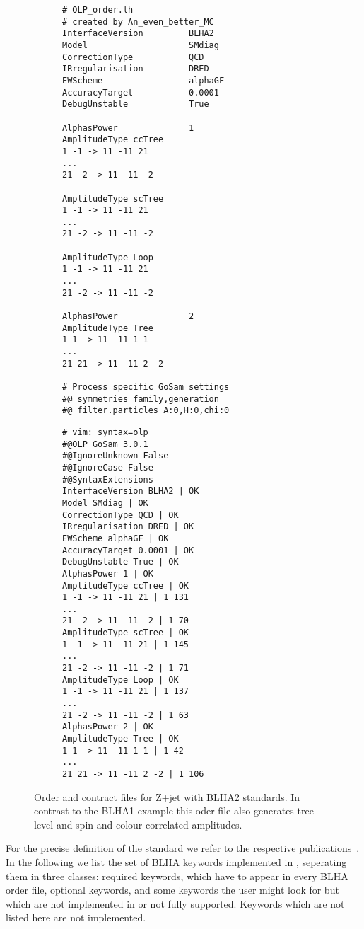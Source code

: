 \begin{figure}
\centering
\begin{subfigure}[]{0.49\textwidth}
\centering
\begin{lstlisting}[title={BLHA2 order file},gobble=0,style=insmall,keepspaces=true,frame=single]
# OLP_order.lh
# created by An_even_better_MC
InterfaceVersion         BLHA2
Model                    SMdiag
CorrectionType           QCD
IRregularisation         DRED
EWScheme                 alphaGF
AccuracyTarget           0.0001
DebugUnstable            True

AlphasPower              1
AmplitudeType ccTree
1 -1 -> 11 -11 21
...
21 -2 -> 11 -11 -2

AmplitudeType scTree
1 -1 -> 11 -11 21
...
21 -2 -> 11 -11 -2

AmplitudeType Loop
1 -1 -> 11 -11 21
...
21 -2 -> 11 -11 -2

AlphasPower              2
AmplitudeType Tree
1 1 -> 11 -11 1 1
...
21 21 -> 11 -11 2 -2

# Process specific GoSam settings
#@ symmetries family,generation
#@ filter.particles A:0,H:0,chi:0
\end{lstlisting}
\end{subfigure}
\hspace*{5pt}
\begin{subfigure}[]{0.46\textwidth}
\centering
\begin{lstlisting}[title={BLHA2 contract file},gobble=0,style=insmall,keepspaces=true,frame=single]
# vim: syntax=olp
#@OLP GoSam 3.0.1
#@IgnoreUnknown False
#@IgnoreCase False
#@SyntaxExtensions
InterfaceVersion BLHA2 | OK
Model SMdiag | OK
CorrectionType QCD | OK
IRregularisation DRED | OK
EWScheme alphaGF | OK
AccuracyTarget 0.0001 | OK
DebugUnstable True | OK
AlphasPower 1 | OK
AmplitudeType ccTree | OK
1 -1 -> 11 -11 21 | 1 131
...
21 -2 -> 11 -11 -2 | 1 70
AmplitudeType scTree | OK
1 -1 -> 11 -11 21 | 1 145
...
21 -2 -> 11 -11 -2 | 1 71
AmplitudeType Loop | OK
1 -1 -> 11 -11 21 | 1 137
...
21 -2 -> 11 -11 -2 | 1 63
AlphasPower 2 | OK
AmplitudeType Tree | OK
1 1 -> 11 -11 1 1 | 1 42
...
21 21 -> 11 -11 2 -2 | 1 106
\end{lstlisting}
\end{subfigure}
\caption{Order and contract files for Z+jet with BLHA2 standards. In contrast to the BLHA1 example this oder file also generates tree-level and spin and colour correlated amplitudes.}
\label{fig:BLHA2}
\end{figure}  

For the precise definition of the standard we refer to the respective publications~\cite{Binoth:2010xt,Alioli:2013nda}. In the following we list the set of BLHA keywords implemented in \gosam, seperating them in three classes: required keywords, which have to appear in every BLHA order file, optional keywords, and some keywords the user might look for but which are not implemented in \gosam or not fully supported. Keywords which are not listed here are not implemented.


